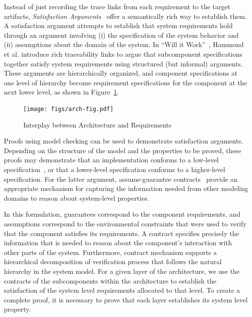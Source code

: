 
\iffalse
Instead of just recording the trace links from each requirement to the target artifacts, \emph{Satisfaction Arguments}~\cite{zave1997four,Hammond01:WiW} offer a semantically rich way to establish them.
A satisfaction argument attempts to establish that system requirements hold through an argument involving (i) the specification of the system behavior and (ii) assumptions about the domain of the system.
In ``Will it Work''~\cite{Hammond01:WiW}, Hammond et al. introduce rich traceability links to argue that subcomponent specifications together satisfy system requirements using structured (but informal) arguments.  These arguments are hierarchically organized, and component specifications at one level of hierarchy become requirement specifications for the component at the next lower level, as shown in Figure~\ref{fig:arch-fig}.

\begin{figure}
 \centering
  \texttt{[image: figs/arch-fig.pdf]}
  \caption{Interplay between Architecture and Requirements}
  \label{fig:arch-fig}
\end{figure}


Proofs using model checking can be used to demonstrate satisfaction arguments.  Depending on the structure of the model and the properties to be proved, these proofs may demonstrate that an implementation conforms to a low-level specification~\cite{Miller10:CACM}, or that a lower-level specification conforms to a higher-level specification.  For the latter argument, assume-guarantee contracts~\cite{NFM2012:CoGaMiWhLaLu,Whalen13:WhatHow:TwinPeaksIEEESoftware} provide an appropriate mechanism for capturing the information needed from other modeling domains to reason about system-level properties.

In this formulation, guarantees correspond to the component requirements, and assumptions correspond to the environmental constraints that were used to verify that the component satisfies its requirements.  A contract specifies precisely the information that is needed to reason about the component’s interaction with other parts of the system. Furthermore, contract mechanism supports a hierarchical decomposition of verification process that follows the natural hierarchy in the system model.  For a given layer of the architecture, we use the contracts of the subcomponents within the architecture to establish the satisfaction of the system level requirements allocated to that level.  To create a complete proof, it is necessary to prove that each layer  establishes its system level property.

